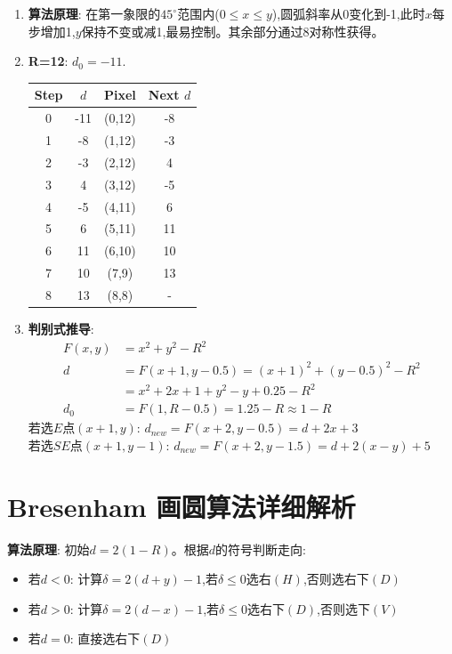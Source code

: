 \documentclass[UTF8]{ctexart}
\begin{document}
\begin{enumerate}
    \item \textbf{算法原理}: 在第一象限的$45^\circ$范围内($0 \le x \le y$),圆弧斜率从0变化到-1,此时$x$每步增加1,$y$保持不变或减1,最易控制。其余部分通过8对称性获得。
    
    \item \textbf{R=12}: $d_0=-11$.
    \begin{center}
    \begin{tabular}{cccc}
    \toprule Step & $d$ & Pixel & Next $d$ \\ \midrule
    0 & -11 & (0,12) & -8 \\
    1 & -8 & (1,12) & -3 \\ 2 & -3 & (2,12) & 4 \\
    3 & 4 & (3,12) & -5 \\ 4 & -5 & (4,11) & 6 \\
    5 & 6 & (5,11) & 11 \\ 6 & 11 & (6,10) & 10 \\
    7 & 10 & (7,9) & 13 \\ 8 & 13 & (8,8) & - \\ \bottomrule
    \end{tabular}
    \end{center}
    
    \item \textbf{判别式推导}: 
    \begin{align*}
    F(x,y) &= x^2+y^2-R^2 \\
    d &= F(x+1, y-0.5) = (x+1)^2+(y-0.5)^2-R^2 \\
    &= x^2+2x+1+y^2-y+0.25-R^2 \\
    d_0 &= F(1, R-0.5) = 1.25-R \approx 1-R
    \end{align*}
    若选$E$点$(x+1,y)$: $d_{new} = F(x+2,y-0.5) = d+2x+3$ \\
    若选$SE$点$(x+1,y-1)$: $d_{new} = F(x+2,y-1.5) = d+2(x-y)+5$
\end{enumerate}

\section{Bresenham 画圆算法详细解析}
\textbf{算法原理}: 初始$d=2(1-R)$。根据$d$的符号判断走向:
\begin{itemize}
    \item 若$d<0$: 计算$\delta=2(d+y)-1$,若$\delta \le 0$选右$(H)$,否则选右下$(D)$
    \item 若$d>0$: 计算$\delta=2(d-x)-1$,若$\delta \le 0$选右下$(D)$,否则选下$(V)$
    \item 若$d=0$: 直接选右下$(D)$
\end{itemize}
\end{document}
